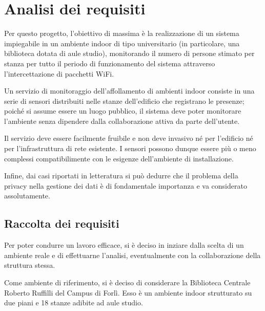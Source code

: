 \section{Analisi dei requisiti}



Per questo progetto, l'obiettivo di massima è la realizzazione di un sistema impiegabile in un ambiente indoor di tipo universitario (in particolare, una biblioteca dotata di aule studio),
monitorando il numero di persone stimato per stanza per tutto il periodo di funzionamento del sistema attraverso l'intercettazione di pacchetti WiFi.

Un servizio di monitoraggio dell'affollamento di ambienti indoor consiste in una serie di sensori distribuiti nelle stanze dell'edificio che registrano le presenze;
poiché si assume essere un luogo pubblico, il sistema deve poter monitorare l'ambiente senza dipendere dalla collaborazione attiva da parte dell'utente.

Il servizio deve essere facilmente fruibile e non deve invasivo né per l'edificio né per l'infrastruttura di rete esistente.
I sensori possono dunque essere più o meno complessi compatibilimente con le esigenze dell'ambiente di installazione.

Infine, dai casi riportati in letteratura si può dedurre che il problema della privacy nella gestione dei dati è di fondamentale importanza e va considerato assolutamente.

\subsection{Raccolta dei requisiti}

Per poter condurre un lavoro efficace, si è deciso in inziare dalla scelta di un ambiente reale e di effettuarne l'analisi, eventualmente con la collaborazione della struttura stessa.

Come ambiente di riferimento, si è deciso di considerare la Biblioteca Centrale Roberto Ruffilli del Campus di Forlì.
Esso è un ambiente indoor strutturato su due piani e 18 stanze adibite ad aule studio.

